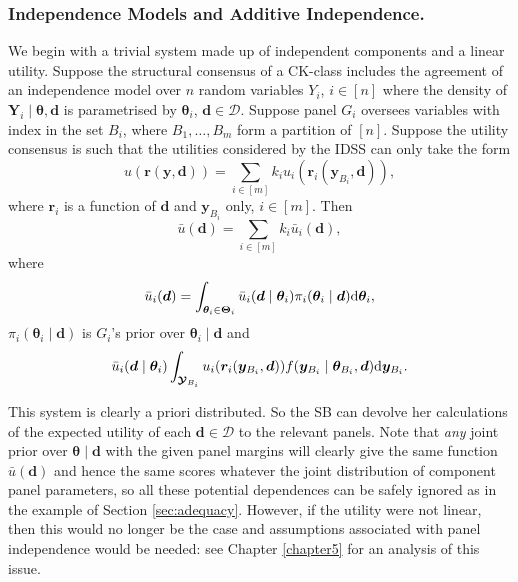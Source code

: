 \subsubsection{Independence Models and Additive Independence.}
\label{sec:indadd}
We begin with a trivial system made up of independent components and a linear utility. Suppose the structural consensus of a  CK-class includes the agreement of an independence model over $n$ random variables $Y_i$, $i\in[n]$ where the density of $\bm{Y}_i\;|\;\bm{\theta},\bm{d}$ is parametrised by $\bm{\theta}_i$, $\bm{d}\in\bm{\mathcal{D}}$. Suppose panel $G_i$ oversees variables with index in the set $B_i$, where $B_1,\dots,B_m$ form a partition of $[n]$. Suppose the utility consensus is such that the utilities considered by the IDSS can only take the form 
\begin{equation*}
u(\bm{r}(\bm{y},\bm{d}))=\sum_{i\in[m]}k_iu_i(\bm{r}_i(\bm{y}_{B_i},\bm{d})),
\end{equation*}
where $\bm{r}_i$ is a function of $\bm{d}$ and $\bm{y}_{B_i}$ only, $i\in[m]$. Then 
\begin{equation*}
\bar{u}(\bm{d})=\sum_{i\in[m]}k_i\bar{u}_{i}(\bm{d}),  
\end{equation*}%
where
\begin{equation*}
\bar{u}_{i}(\bm{d})=\int_{\bm{\theta }_{i}\in \bm{\Theta} _{i}}\bar{u}_{i}(\bm{d}\;|\;\bm{\theta }_{i})\pi _{i}(\bm{\theta }_{i}\;|\;\bm{d})\textnormal{d}\bm{\theta }_{i},
\end{equation*}%
$\pi _{i}(\bm{\theta }_{i}\;|\;\bm{d})$ is $G_{i}$'s prior over $\bm{\theta }_{i}\;|\;\bm{d}$ and 
\begin{equation*}
\bar{u}_i(\bm{d}\;|\;\bm{\theta}_i)\int_{\bm{\mathcal{Y}}_{B_i}}u_i(\bm{r}_i(\bm{y}_{B_i},\bm{d}))f(\bm{y}_{B_i}\;|\;\bm{\theta}_{B_i},\bm{d})\textnormal{d} \bm{y}_{B_i}.
\end{equation*}

This system is clearly a priori distributed. So the SB can devolve her calculations of the expected utility of each $\bm{d}\in \bm{\mathcal{D}}$ to the relevant panels. Note that  \emph{any} joint prior over $\bm{\theta }\;|\;\bm{d}$ with the given panel margins will clearly give the same function $\bar{u}(\bm{d})$ and hence the same scores whatever the joint distribution of component panel parameters, so all these potential dependences can be safely ignored as in the example of Section \ref{sec:adequacy}. However, if the utility were not linear, then this would no longer be the case and  assumptions associated with panel independence would be needed: see Chapter \ref{chapter5} for an analysis of this issue.

